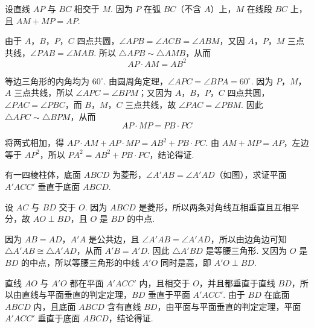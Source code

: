 \documentclass[UTF8,a4paper,oneside,11pt]{ctexbook}
\begin{document}
\begin{solution}
设直线 \(AP\) 与 \(BC\) 相交于 \(M\). 因为 \(P\) 在弧 \(BC\)（不含 \(A\)）上，\(M\) 在线段 \(BC\) 上，且 \(AM+MP=AP\).

\begingroup
{}
\endgroup

由于 \(A\)，\(B\)，\(P\)，\(C\) 四点共圆，\(\angle APB=\angle ACB=\angle ABM\)，又因 \(A\)，\(P\)，\(M\) 三点共线，\(\angle PAB=\angle MAB\). 所以 \(\triangle APB\sim\triangle AMB\)，从而
\[
AP\cdot AM=AB^{2}
\]

等边三角形的内角均为 \(60^{\circ}\). 由圆周角定理，\(\angle APC=\angle BPA=60^{\circ}\). 因为 \(P\)，\(M\)，\(A\) 三点共线，所以 \(\angle APC=\angle BPM\)；又因为 \(A\)，\(B\)，\(P\)，\(C\) 四点共圆，\(\angle PAC=\angle PBC\)，而 \(B\)，\(M\)，\(C\) 三点共线，故 \(\angle PAC=\angle PBM\). 因此 \(\triangle APC\sim\triangle BPM\)，从而
\[
AP\cdot MP=PB\cdot PC
\]

将两式相加，得 \(AP\cdot AM+AP\cdot MP=AB^{2}+PB\cdot PC\). 由 \(AM+MP=AP\)，左边等于 \(AP^{2}\)，所以 \(PA^{2}=AB^{2}+PB\cdot PC\)，结论得证.
\end{solution}

\begin{problem}
有一四棱柱体，底面 \(ABCD\) 为菱形，\(\angle A'AB=\angle A'AD\)（如图），求证平面 \(A'ACC'\) 垂直于底面 \(ABCD\).

\end{problem}

\begin{solution}
设 \(AC\) 与 \(BD\) 交于 \(O\). 因为 \(ABCD\) 是菱形，所以两条对角线互相垂直且互相平分，故 \(AO\perp BD\)，且 \(O\) 是 \(BD\) 的中点.

\begingroup
{}
\endgroup

因为 \(AB=AD\)，\(A'A\) 是公共边，且 \(\angle A'AB=\angle A'AD\)，所以由边角边可知 \(\triangle A'AB\cong\triangle A'AD\)，从而 \(A'B=A'D\). 因此 \(\triangle A'BD\) 是等腰三角形. 又因为 \(O\) 是 \(BD\) 的中点，所以等腰三角形的中线 \(A'O\) 同时是高，即 \(A'O\perp BD\).

直线 \(AO\) 与 \(A'O\) 都在平面 \(A'ACC'\) 内，且相交于 \(O\)，并且都垂直于直线 \(BD\)，所以由直线与平面垂直的判定定理，\(BD\) 垂直于平面 \(A'ACC'\). 由于 \(BD\) 在底面 \(ABCD\) 内，且底面 \(ABCD\) 含有直线 \(BD\)，由平面与平面垂直的判定定理，平面 \(A'ACC'\) 垂直于底面 \(ABCD\)，结论得证.
\end{solution}
\end{document}
